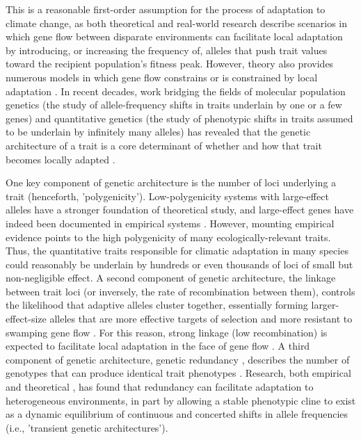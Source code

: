 \documentclass[9pt,twocolumn,twoside,lineno]{pnas-new}
\begin{document}
This is a reasonable first-order assumption
for the process of adaptation to climate change,
as both theoretical
\cite{aitken_whitlock,slatkin,tigano}
and real-world \cite{feder} research describe scenarios in which
gene flow between disparate environments can facilitate local adaptation
by introducing, or increasing the frequency of, alleles 
that push trait values toward
the recipient population's fitness peak.
However, theory also provides numerous models
in which gene flow constrains or is constrained by
local adaptation
\cite{wang,lenormand,slatkin,haldane,wright,felsenstein}.
In recent decades, work bridging the fields
of molecular population genetics
(the study of allele-frequency shifts
in traits underlain by one or a few genes)
and quantitative genetics
(the study of phenotypic shifts in
traits assumed to be underlain by infinitely many alleles)
\cite{barghi_polygenic,barton,pritchard_human_adaptation,pritchard_sweeps_alone}
has revealed that the genetic architecture of a trait
is a core determinant of whether and how that trait
becomes locally adapted \cite{yeaman_review}. 

One key component of genetic architecture is the number of loci 
underlying a trait (henceforth, 'polygenicity'). 
Low-polygenicity systems with large-effect alleles
have a stronger foundation of theoretical study,
and large-effect genes have indeed been documented in empirical systems \cite{martin,rees}.
However, mounting empirical evidence points to the high polygenicity 
of many ecologically-relevant traits\cite{boyle,rockman,savolainen,sella,barghi_polygenic}.
Thus, the quantitative traits responsible for climatic adaptation in many species could reasonably be 
underlain by hundreds or even thousands of loci of small but non-negligible effect.
A second component of genetic architecture, the linkage between trait loci
(or inversely, the rate of recombination between them),
controls the likelihood that adaptive alleles cluster together,
essentially forming larger-effect-size alleles that are more 
effective targets of selection and more resistant
to swamping gene flow \cite{yeaman_whitlock}.
For this reason, strong linkage (low recombination)
is expected to facilitate local
adaptation in the face of gene flow \cite{tigano}.
A third component of genetic architecture,
genetic redundancy \cite{barghi_polygenic,laruson},
describes the number of genotypes
that can produce identical trait phenotypes \cite{yeaman_review,laruson,barghi_polygenic}.
Research, both empirical \cite{barghi_redundancy,manceau} and theoretical \cite{yeaman_amnat},
has found that redundancy can facilitate
adaptation to heterogeneous environments, in part by
allowing a stable phenotypic cline to exist as a dynamic equilibrium
of continuous and concerted shifts in allele frequencies
(i.e., 'transient genetic architectures').
\end{document}
